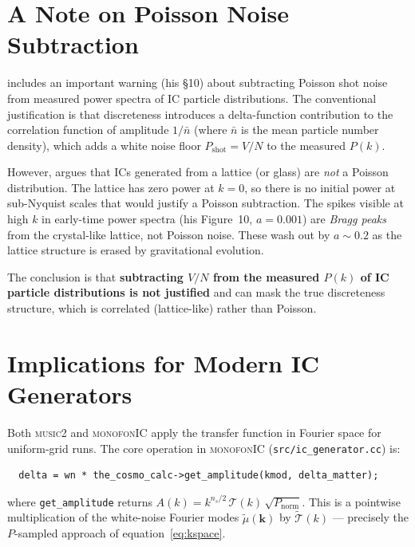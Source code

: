 \documentclass[12pt]{article}
\begin{document}
\section{A Note on Poisson Noise Subtraction}
\label{sec:shotnoise}

\citet{Sirko2005} includes an important warning (his \S10) about
subtracting Poisson shot noise from measured power spectra of IC
particle distributions.  The conventional justification is that
discreteness introduces a delta-function contribution to the correlation
function of amplitude $1/\bar{n}$ (where $\bar{n}$ is the mean particle
number density), which adds a white noise floor $P_\mathrm{shot} = V/N$
to the measured $P(k)$.

However, \citet{Sirko2005} argues that ICs generated from a lattice (or
glass) are \emph{not} a Poisson distribution.  The lattice has zero
power at $k = 0$, so there is no initial power at sub-Nyquist scales
that would justify a Poisson subtraction.  The spikes visible at high
$k$ in early-time power spectra (his Figure~10, $a = 0.001$) are
\emph{Bragg peaks} from the crystal-like lattice, not Poisson noise.
These wash out by $a \sim 0.2$ as the lattice structure is erased by
gravitational evolution.

The conclusion is that \textbf{subtracting $V/N$ from the measured
$P(k)$ of IC particle distributions is not justified} and can mask the
true discreteness structure, which is correlated (lattice-like) rather
than Poisson.

\section{Implications for Modern IC Generators}
\label{sec:modern}

Both \textsc{music2} \citep{Hahn2011} and \textsc{monofonIC} apply the
transfer function in Fourier space for uniform-grid runs.  The core
operation in \textsc{monofonIC} (\texttt{src/ic\_generator.cc}) is:
%
\begin{verbatim}
  delta = wn * the_cosmo_calc->get_amplitude(kmod, delta_matter);
\end{verbatim}
%
where \texttt{get\_amplitude} returns
$A(k) = k^{n_s/2}\,\mathcal{T}(k)\,\sqrt{P_\mathrm{norm}}$.
This is a pointwise multiplication of the white-noise Fourier modes
$\tilde{\mu}(\mathbf{k})$ by $\tilde{\mathcal{T}}(k)$ --- precisely the
$P$-sampled approach of equation~\eqref{eq:kspace}.
\end{document}
